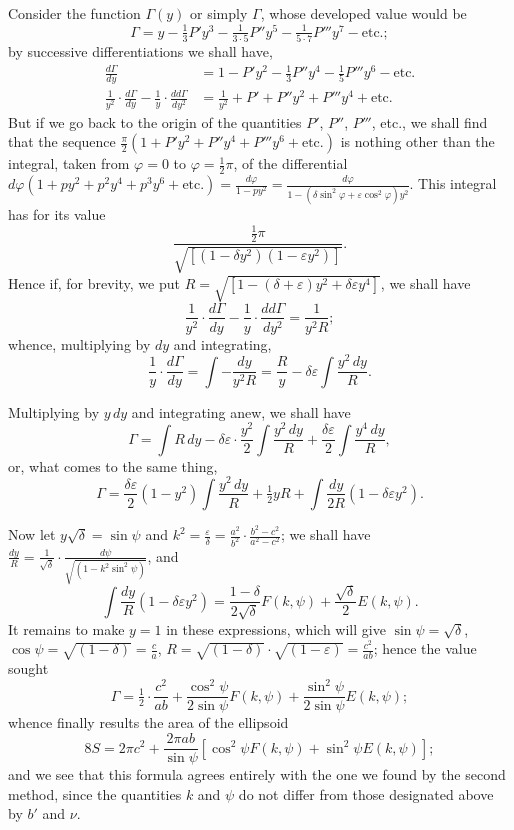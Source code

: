 \documentclass{article}
\begin{document}
Consider the function $\Gamma(y)$ or simply $\Gamma$, whose developed value would be
\[ \Gamma=y-\tfrac{1}{3}P'y^{3}-\tfrac{1}{3\cdot5}P''y^{5}-\tfrac{1}{5\cdot7}P'''y^{7}-\text{etc.}; \]
by successive differentiations we shall have,
\[ \begin{aligned} \frac{d\Gamma}{dy}&=1-P'y^{2}-\tfrac{1}{3}P''y^{4}-\tfrac{1}{5}P'''y^{6}-\text{etc.}\\ \frac{1}{y^{2}}\cdot\frac{d\Gamma}{dy}-\frac{1}{y}\cdot\frac{dd\Gamma}{dy^{2}}&=\frac{1}{y^{2}}+P'+P''y^{2}+P'''y^{4}+\text{etc.} \end{aligned} \]
But if we go back to the origin of the quantities $P'$, $P''$, $P'''$, etc., we shall find that the sequence $\frac{\pi}{2}(1+P'y^{2}+P''y^{4}+P'''y^{6}+\text{etc.})$ is nothing other than the integral, taken from $\varphi=0$ to $\varphi=\frac{1}{2}\pi$, of the differential $d\varphi(1+py^{2}+p^{2}y^{4}+p^{3}y^{6}+\text{etc.})=\frac{d\varphi}{1-py^{2}}=\frac{d\varphi}{1-(\delta\sin^{2}\varphi+\varepsilon\cos^{2}\varphi)y^{2}}$. This integral has for its value
\[ \frac{\tfrac{1}{2}\pi}{\sqrt{[(1-\delta y^{2})(1-\varepsilon y^{2})]}}. \]
Hence if, for brevity, we put $R=\sqrt{[1-(\delta+\varepsilon)y^{2}+\delta\varepsilon y^{4}]}$, we shall have
\[ \frac{1}{y^{2}}\cdot\frac{d\Gamma}{dy}-\frac{1}{y}\cdot\frac{dd\Gamma}{dy^{2}}=\frac{1}{y^{2}R}; \]
whence, multiplying by $dy$ and integrating,
\[ \frac{1}{y}\cdot\frac{d\Gamma}{dy}=\int-\frac{dy}{y^{2}R}=\frac{R}{y}-\delta\varepsilon\int\frac{y^{2}\,dy}{R}. \]

Multiplying by $y\,dy$ and integrating anew, we shall have
\[ \Gamma=\int R\,dy-\delta\varepsilon\cdot\frac{y^{2}}{2}\int\frac{y^{2}\,dy}{R}+\frac{\delta\varepsilon}{2}\int\frac{y^{4}\,dy}{R}, \]
or, what comes to the same thing,
\[ \Gamma=\frac{\delta\varepsilon}{2}(1-y^{2})\int\frac{y^{2}\,dy}{R}+\tfrac{1}{2}yR+\int\frac{dy}{2R}(1-\delta\varepsilon y^{2}). \]

Now let $y\sqrt{\delta}=\sin\psi$ and $k^{2}=\frac{\varepsilon}{\delta}=\frac{a^{2}}{b^{2}}\cdot\frac{b^{2}-c^{2}}{a^{2}-c^{2}}$; we shall have $\frac{dy}{R}=\frac{1}{\sqrt{\delta}}\cdot\frac{d\psi}{\sqrt{(1-k^{2}\sin^{2}\psi)}}$, and
\[ \int\frac{dy}{R}(1-\delta\varepsilon y^{2})=\frac{1-\delta}{2\sqrt{\delta}}F(k,\psi)+\frac{\sqrt{\delta}}{2}E(k,\psi). \]
It remains to make $y=1$ in these expressions, which will give $\sin\psi=\sqrt{\delta}$, $\cos\psi=\sqrt{(1-\delta)}=\frac{c}{a}$, $R=\sqrt{(1-\delta)}\cdot\sqrt{(1-\varepsilon)}=\frac{c^{2}}{ab}$; hence the value sought
\[ \Gamma=\tfrac{1}{2}\cdot\frac{c^{2}}{ab}+\frac{\cos^{2}\psi}{2\sin\psi}F(k,\psi)+\frac{\sin^{2}\psi}{2\sin\psi}E(k,\psi); \]
whence finally results the area of the ellipsoid
\[ 8S=2\pi c^{2}+\frac{2\pi ab}{\sin\psi}[\cos^{2}\psi F(k,\psi)+\sin^{2}\psi E(k,\psi)]; \]
and we see that this formula agrees entirely with the one we found by the second method, since the quantities $k$ and $\psi$ do not differ from those designated above by $b'$ and $\nu$.
\end{document}
